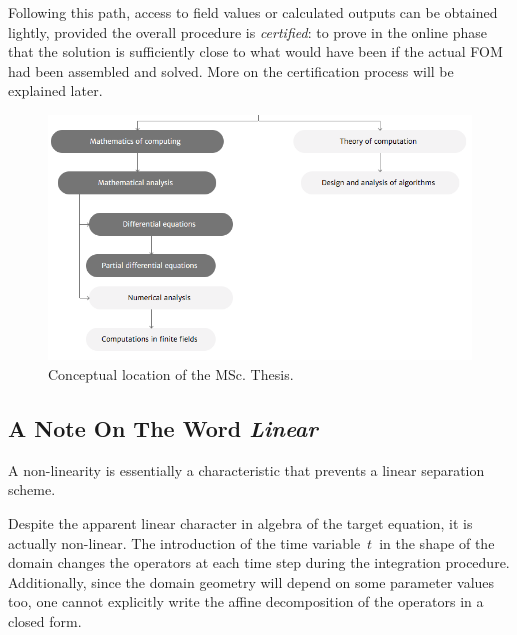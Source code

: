\documentclass[../main.tex]{subfiles}
\begin{document}
Following this path, access to field values or calculated outputs can be obtained lightly, provided the overall procedure is \textit{certified}: 
to prove in the online phase that the solution is sufficiently close to what would have been if the actual FOM had been assembled and solved.
More on the certification process will be explained later.



\begin{figure}[h]
   \includegraphics[width=\columnwidth]{research_project/figures/index.png}
   \caption{Conceptual location of the MSc. Thesis.}
\end{figure}



\subsection{A Note On The Word \textit{Linear}}
A non-linearity is essentially a characteristic that prevents a linear separation scheme.

Despite the apparent linear character in algebra of the target equation, it is actually non-linear.
The introduction of the time variable~$t$~in the shape of the domain changes the operators at each time step during the integration procedure. 
Additionally, since the domain geometry will depend on some parameter values too, one cannot explicitly write the affine decomposition of the operators in a closed form.  
\end{document}
